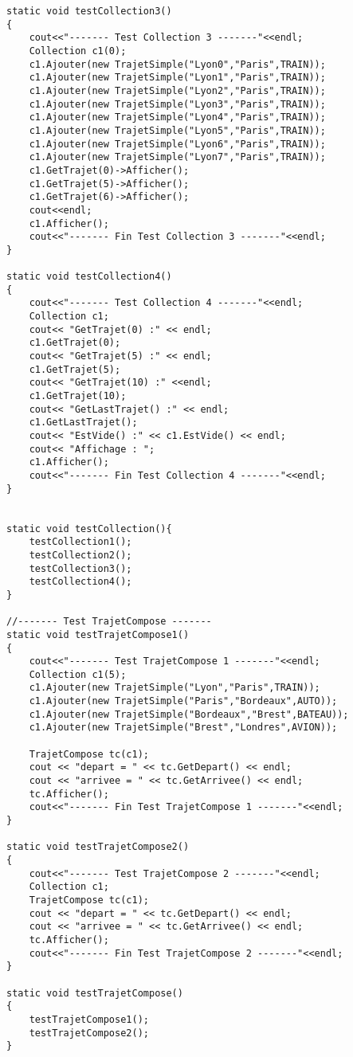 \begin{verbatim}
static void testCollection3()
{
    cout<<"------- Test Collection 3 -------"<<endl;
    Collection c1(0);
    c1.Ajouter(new TrajetSimple("Lyon0","Paris",TRAIN));
    c1.Ajouter(new TrajetSimple("Lyon1","Paris",TRAIN));
    c1.Ajouter(new TrajetSimple("Lyon2","Paris",TRAIN));
    c1.Ajouter(new TrajetSimple("Lyon3","Paris",TRAIN));
    c1.Ajouter(new TrajetSimple("Lyon4","Paris",TRAIN));
    c1.Ajouter(new TrajetSimple("Lyon5","Paris",TRAIN));
    c1.Ajouter(new TrajetSimple("Lyon6","Paris",TRAIN));
    c1.Ajouter(new TrajetSimple("Lyon7","Paris",TRAIN));
    c1.GetTrajet(0)->Afficher();
    c1.GetTrajet(5)->Afficher();
    c1.GetTrajet(6)->Afficher();
    cout<<endl;
    c1.Afficher();
    cout<<"------- Fin Test Collection 3 -------"<<endl;
}

static void testCollection4()
{
    cout<<"------- Test Collection 4 -------"<<endl;
    Collection c1;
    cout<< "GetTrajet(0) :" << endl;
    c1.GetTrajet(0);
    cout<< "GetTrajet(5) :" << endl;
    c1.GetTrajet(5);
    cout<< "GetTrajet(10) :" <<endl;
    c1.GetTrajet(10);
    cout<< "GetLastTrajet() :" << endl;
    c1.GetLastTrajet();
    cout<< "EstVide() :" << c1.EstVide() << endl;
    cout<< "Affichage : ";
    c1.Afficher();
    cout<<"------- Fin Test Collection 4 -------"<<endl;
}


static void testCollection(){
    testCollection1();
    testCollection2();
    testCollection3();
    testCollection4();
}

//------- Test TrajetCompose -------
static void testTrajetCompose1()
{
    cout<<"------- Test TrajetCompose 1 -------"<<endl;
    Collection c1(5);
    c1.Ajouter(new TrajetSimple("Lyon","Paris",TRAIN));
    c1.Ajouter(new TrajetSimple("Paris","Bordeaux",AUTO));
    c1.Ajouter(new TrajetSimple("Bordeaux","Brest",BATEAU));
    c1.Ajouter(new TrajetSimple("Brest","Londres",AVION));
    
    TrajetCompose tc(c1);
    cout << "depart = " << tc.GetDepart() << endl;
    cout << "arrivee = " << tc.GetArrivee() << endl;
    tc.Afficher();
    cout<<"------- Fin Test TrajetCompose 1 -------"<<endl;
}

static void testTrajetCompose2()
{
    cout<<"------- Test TrajetCompose 2 -------"<<endl;
    Collection c1;
    TrajetCompose tc(c1);
    cout << "depart = " << tc.GetDepart() << endl;
    cout << "arrivee = " << tc.GetArrivee() << endl;
    tc.Afficher();
    cout<<"------- Fin Test TrajetCompose 2 -------"<<endl;
}

static void testTrajetCompose()
{
    testTrajetCompose1();
    testTrajetCompose2();
}


\end{verbatim}
